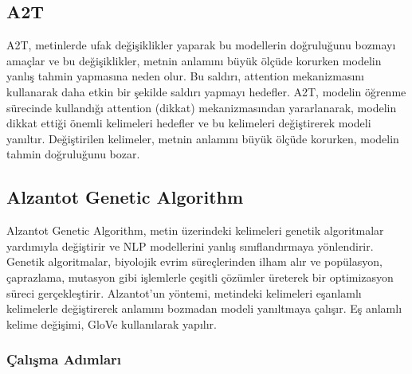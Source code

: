 \newpage

\subsection{A2T}

A2T, metinlerde ufak değişiklikler yaparak bu modellerin doğruluğunu bozmayı amaçlar ve bu değişiklikler, metnin anlamını büyük ölçüde korurken modelin yanlış tahmin yapmasına neden olur. Bu saldırı, attention mekanizmasını kullanarak daha etkin bir şekilde saldırı yapmayı hedefler. A2T, modelin öğrenme sürecinde kullandığı attention (dikkat) mekanizmasından yararlanarak, modelin dikkat ettiği önemli kelimeleri hedefler ve bu kelimeleri değiştirerek modeli yanıltır. Değiştirilen kelimeler, metnin anlamını büyük ölçüde korurken, modelin tahmin doğruluğunu bozar. 

\newpage

\subsection{Alzantot Genetic Algorithm}

Alzantot Genetic Algorithm, metin üzerindeki kelimeleri genetik algoritmalar yardımıyla değiştirir ve NLP modellerini yanlış sınıflandırmaya yönlendirir. Genetik algoritmalar, biyolojik evrim süreçlerinden ilham alır ve popülasyon, çaprazlama, mutasyon gibi işlemlerle çeşitli çözümler üreterek bir optimizasyon süreci gerçekleştirir. Alzantot'un yöntemi, metindeki kelimeleri eşanlamlı kelimelerle değiştirerek anlamını bozmadan modeli yanıltmaya çalışır. Eş anlamlı kelime değişimi, GloVe kullanılarak yapılır.

\subsubsection{Çalışma Adımları}

